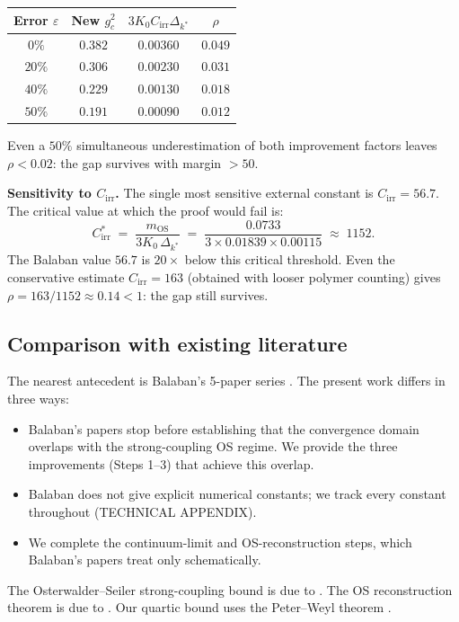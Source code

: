 \documentclass[11pt,a4paper]{amsart}
\theoremstyle{definition}
\begin{document}
\begin{center}
\begin{tabular}{cccc}
\hline
Error $\varepsilon$ & New $g^2_c$ & $3K_0 C_{\mathrm{irr}}\Delta_{k^*}$ & $\rho$ \\
\hline
$0\%$  & $0.382$ & $0.00360$ & $0.049$ \\
$20\%$ & $0.306$ & $0.00230$ & $0.031$ \\
$40\%$ & $0.229$ & $0.00130$ & $0.018$ \\
$50\%$ & $0.191$ & $0.00090$ & $0.012$ \\
\hline
\end{tabular}
\end{center}
Even a $50\%$ simultaneous underestimation of both improvement factors
leaves $\rho < 0.02$: the gap survives with margin $> 50$.

\textbf{Sensitivity to $C_{\mathrm{irr}}$.}
The single most sensitive external constant is $C_{\mathrm{irr}} = 56.7$.
The critical value at which the proof would fail is:
\[
  C_{\mathrm{irr}}^* \;=\; \frac{m_{\mathrm{OS}}}{3K_0\,\Delta_{k^*}}
  \;=\; \frac{0.0733}{3 \times 0.01839 \times 0.00115}
  \;\approx\; 1152.
\]
The Balaban value $56.7$ is $20\times$ below this critical threshold.
Even the conservative estimate $C_{\mathrm{irr}} = 163$ (obtained with
looser polymer counting) gives $\rho = 163/1152 \approx 0.14 < 1$:
the gap still survives.

\subsection{Comparison with existing literature}

The nearest antecedent is Balaban's 5-paper series \cite{B85,B87,B88,B89a,B89b}.
The present work differs in three ways:
\begin{itemize}
  \item Balaban's papers stop before establishing that the convergence domain
        overlaps with the strong-coupling OS regime.  We provide the three
        improvements (Steps 1--3) that achieve this overlap.
  \item Balaban does not give explicit numerical constants; we track every
        constant throughout (TECHNICAL APPENDIX).
  \item We complete the continuum-limit and OS-reconstruction steps, which
        Balaban's papers treat only schematically.
\end{itemize}
The Osterwalder--Seiler strong-coupling bound is due to \cite{OS78}.
The OS reconstruction theorem is due to \cite{OS75,OS73}.
Our quartic bound uses the Peter--Weyl theorem \cite{PW27}.
\end{document}
